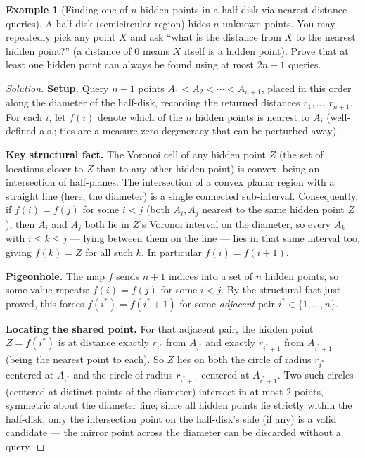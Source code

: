 \documentclass[11pt]{article}
\theoremstyle{definition}
\newtheorem{example}{Example}[section]
\begin{document}
\begin{example}[Finding one of $n$ hidden points in a half-disk via nearest-distance queries]
A half-disk (semicircular region) hides $n$ unknown points. You may repeatedly pick any point $X$ and ask ``what is the distance from $X$ to the nearest hidden point?'' (a distance of $0$ means $X$ itself is a hidden point). Prove that at least one hidden point can always be found using at most $2n+1$ queries.
\end{example}
\begin{proof}[Solution]
\textbf{Setup.} Query $n+1$ points $A_1<A_2<\cdots<A_{n+1}$, placed in this order along the diameter of the half-disk, recording the returned distances $r_1,\dots,r_{n+1}$. For each $i$, let $f(i)$ denote which of the $n$ hidden points is nearest to $A_i$ (well-defined a.s.; ties are a measure-zero degeneracy that can be perturbed away).

\textbf{Key structural fact.} The Voronoi cell of any hidden point $Z$ (the set of locations closer to $Z$ than to any other hidden point) is convex, being an intersection of half-planes. The intersection of a convex planar region with a straight line (here, the diameter) is a single connected sub-interval. Consequently, if $f(i)=f(j)$ for some $i<j$ (both $A_i,A_j$ nearest to the same hidden point $Z$), then $A_i$ and $A_j$ both lie in $Z$'s Voronoi interval on the diameter, so every $A_k$ with $i\le k\le j$ — lying between them on the line — lies in that same interval too, giving $f(k)=Z$ for all such $k$. In particular $f(i)=f(i+1)$.

\textbf{Pigeonhole.} The map $f$ sends $n+1$ indices into a set of $n$ hidden points, so some value repeats: $f(i)=f(j)$ for some $i<j$. By the structural fact just proved, this forces $f(i^*)=f(i^*+1)$ for some \emph{adjacent} pair $i^*\in\{1,\dots,n\}$.

\textbf{Locating the shared point.} For that adjacent pair, the hidden point $Z=f(i^*)$ is at distance exactly $r_{i^*}$ from $A_{i^*}$ and exactly $r_{i^*+1}$ from $A_{i^*+1}$ (being the nearest point to each). So $Z$ lies on both the circle of radius $r_{i^*}$ centered at $A_{i^*}$ and the circle of radius $r_{i^*+1}$ centered at $A_{i^*+1}$. Two such circles (centered at distinct points of the diameter) intersect in at most $2$ points, symmetric about the diameter line; since all hidden points lie strictly within the half-disk, only the intersection point on the half-disk's side (if any) is a valid candidate — the mirror point across the diameter can be discarded without a query.


\end{proof}
\end{document}

